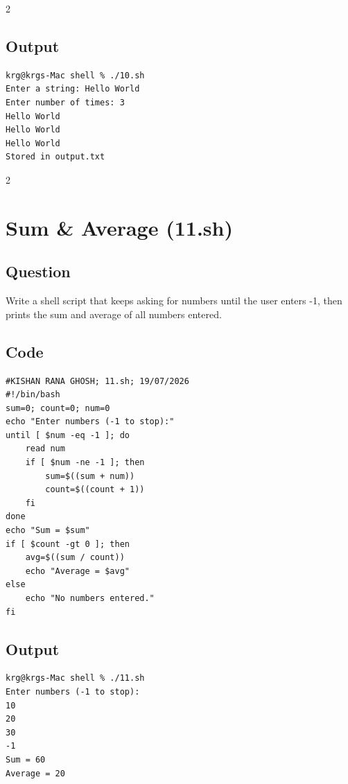 \documentclass[a4paper,12pt]{article}
\begin{document}
\begin{multicols}{2}
\subsection*{Output}
\begin{lstlisting}[style=outputstyle]
krg@krgs-Mac shell % ./10.sh
Enter a string: Hello World
Enter number of times: 3
Hello World
Hello World
Hello World
Stored in output.txt
\end{lstlisting}

\end{multicols}
\newpage

\begin{multicols}{2}

\section{Sum \& Average (11.sh)}
\subsection*{Question}
Write a shell script that keeps asking for numbers until the user enters -1, then prints the sum and average of all numbers entered.

\subsection*{Code}
\begin{lstlisting}[style=bashstyle]
#KISHAN RANA GHOSH; 11.sh; 19/07/2026
#!/bin/bash
sum=0; count=0; num=0
echo "Enter numbers (-1 to stop):"
until [ $num -eq -1 ]; do
    read num
    if [ $num -ne -1 ]; then
        sum=$((sum + num))
        count=$((count + 1))
    fi
done
echo "Sum = $sum"
if [ $count -gt 0 ]; then
    avg=$((sum / count))
    echo "Average = $avg"
else
    echo "No numbers entered."
fi
\end{lstlisting}

\subsection*{Output}
\begin{lstlisting}[style=outputstyle]
krg@krgs-Mac shell % ./11.sh
Enter numbers (-1 to stop):
10
20
30
-1
Sum = 60
Average = 20
\end{lstlisting}

\columnbreak


\end{multicols}
\end{document}
